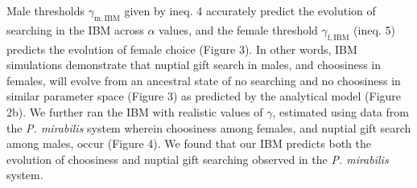 \documentclass[
]{article}
\begin{document}
Male thresholds \(\gamma_{\mathrm{m, IBM}}\) given by ineq. 4 accurately
predict the evolution of searching in the IBM across \(\alpha\) values,
and the female threshold \(\gamma_{\mathrm{f, IBM}}\) (ineq. 5) predicts
the evolution of female choice (Figure 3). In other words, IBM
simulations demonstrate that nuptial gift search in males, and
choosiness in females, will evolve from an ancestral state of no
searching and no choosiness in similar parameter space (Figure 3) as
predicted by the analytical model (Figure 2b). We further ran the IBM
with realistic values of \(\gamma\), estimated using data from the
\emph{P. mirabilis} system wherein choosiness among females, and nuptial
gift search among males, occur (Figure 4). We found that our IBM
predicts both the evolution of choosiness and nuptial gift searching
observed in the \emph{P. mirabilis} system.
\end{document}
